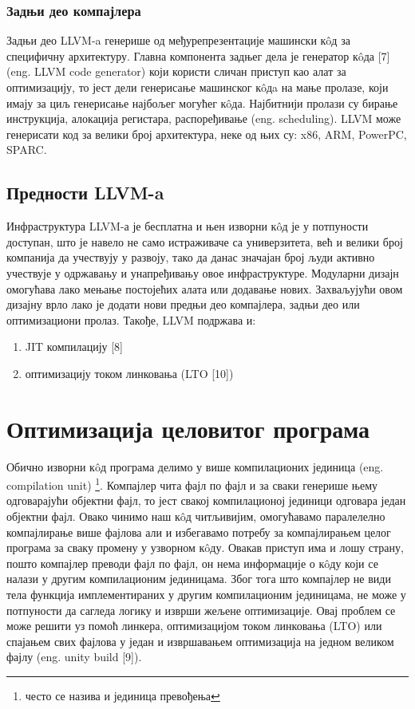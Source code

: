 \documentclass[12pt,oneside]{memoir}
\begin{document}
\subsection{Задњи део компајлера} 
Задњи део LLVM-a генерише од међурепрезентације машински к\^{o}д за специфичну архитектуру. 
Главна компонента задњег дела је генератор к\^{o}да [7] (eng. LLVM code generator) који
користи сличан приступ као алат за оптимизацију, то јест дели генерисање машинског
к\^{o}дa на мање пролазе, који имају за циљ генерисање најбољег могућег к\^{o}да.
Најбитнији пролази су бирање инструкција, алокација регистара, распоређивање
(eng. scheduling).
LLVM може генерисати код за велики број архитектура, неке од њих су: x86, ARM,
PowerPC, SPARC.

\section{Предности LLVM-a}

Инфраструктура LLVM-а је бесплатна и њен изворни к\^{o}д је у потпуности доступан, 
што је навело не само истраживаче са универзитета, већ и велики број компанија 
да учествују у развоју, тако да данас значајан број људи активно 
учествује у одржавању и унапређивању овое инфраструктуре.
Модуларни дизајн омогућава лако мењање постојећих алата или додавање нових.
Захваљујући овом дизајну врло лако је додати нови предњи део компајлера, задњи део или
оптимизациони пролаз.
Такође, LLVM подржава и:
\begin{enumerate}
\item JIT компилацију [8]
\item оптимизацију током линковања (LTO [10])
\end{enumerate}

\chapter{Оптимизација целовитог програма}

Обично изворни к\^{o}д програма делимо у више компилационих јединица (eng. compilation unit) \footnote{често се назива и јединица превођења}.
Компајлер чита фајл по фајл и за сваки генерише њему одговарајући објектни фајл,
то јест свакој компилационој јединици одговара један објектни фајл.
Овако чинимо наш к\^{o}д читљивијим, омогућавамо паралелелно компајлирање више 
фајлова али и избегавамо потребу за компајлирањем целог програма за сваку промену
у узворном к\^{o}ду.
Овакав приступ има и лошу страну, пошто компајлер преводи фајл по фајл, он нема 
информације о к\^{o}ду који се налази у другим компилационим јединицама.
Због тога што компајлер не види тела функција имплементираних у другим компилационим
јединицама, не може у потпуности да сагледа логику и изврши жељене оптимизације.
Овај проблем се може решити уз помоћ линкера,
оптимизацијом током линковања (LTO) или спајањем свих фајлова у један и извршавањем
оптимизација на једном великом фајлу (eng. unity build [9]).
\end{document}
